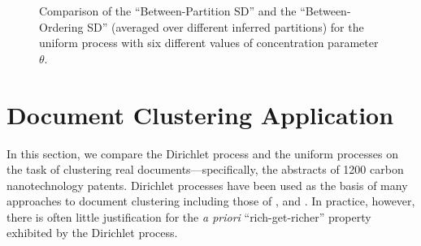 \documentclass[twoside]{article}
\begin{document}
\begin{figure}[t]
\vspace{-0.5cm}
\centering
{}
\caption{Comparison of the ``Between-Partition SD'' and the ``Between-Ordering
  SD'' (averaged over different inferred partitions) for the uniform
  process with six different values of concentration parameter
  $\theta$.}\label{orderingfig}
\vspace{-0.4cm}
\end{figure}

\section{Document Clustering Application}\label{application}

In this section, we compare the Dirichlet process and the uniform
processes on the task of clustering real documents---specifically, the
abstracts of 1200 carbon nanotechnology patents.  Dirichlet processes
have been used as the basis of many approaches to document clustering
including those of \cite{ZhaGhaYan05}, \cite{ZhuGhaLaf05} and
\cite{Wal08}. In practice, however, there is often little
justification for the \emph{a priori} ``rich-get-richer'' property
exhibited by the Dirichlet process.
\end{document}
